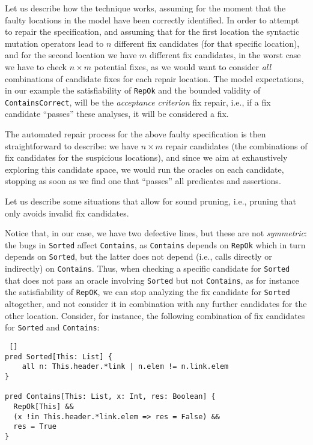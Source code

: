 Let us describe how the technique works, assuming for the moment that the faulty locations in the model have been correctly identified. In order to attempt to repair the specification, and assuming that for the first location the syntactic mutation operators lead to $n$ different fix candidates (for that specific location), and for the second location we have $m$ different fix candidates, in the worst case we have to check $n \times m$ potential fixes, as we would want to consider \emph{all} combinations of candidate fixes for each repair location. The model expectations, in our example the satisfiability of \texttt{RepOk} and the bounded validity of \texttt{ContainsCorrect}, will be the \emph{acceptance criterion} fix repair, i.e., if a fix candidate ``passes'' these analyses, it will be considered a fix.

The automated repair process for the above faulty specification is then straightforward to describe: we have $n \times m$ repair candidates (the combinations of fix candidates for the suspicious locations), and since we aim at exhaustively exploring this candidate space, we would run the oracles on each candidate, stopping as soon as we find one that ``passes'' all predicates and assertions. 

Let us describe some situations that allow for sound pruning, i.e., pruning that only avoids invalid fix candidates. 

Notice that, in our case, we have two defective lines, but these are not \emph{symmetric}: the bugs in \texttt{Sorted} affect \texttt{Contains}, as \texttt{Contains} depends on \texttt{RepOk} which in turn depends on \texttt{Sorted}, but the latter does not depend (i.e., calls directly or indirectly) on \texttt{Contains}. Thus, when checking a specific candidate for \texttt{Sorted} that does not pass an oracle involving \texttt{Sorted} but not \texttt{Contains}, as for instance the satisfiability of \texttt{RepOK}, we can stop analyzing the fix candidate for \texttt{Sorted} altogether, and not consider it in combination with any further candidates for the other location. Consider, for instance, the following combination of fix candidates for \texttt{Sorted} and \texttt{Contains}:

\begin{lstlisting} []
pred Sorted[This: List] {
    all n: This.header.*link | n.elem != n.link.elem
}

pred Contains[This: List, x: Int, res: Boolean] {
  RepOk[This] &&
  (x !in This.header.*link.elem => res = False) && 
  res = True
}
\end{lstlisting}

